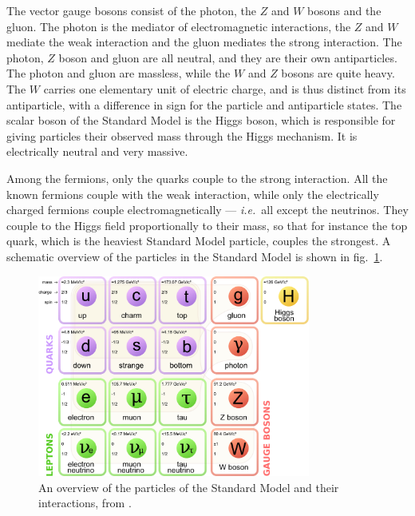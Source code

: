 \documentclass[twoside,english]{uiofysmaster}
\begin{document}
The vector gauge bosons consist of the photon, the $Z$ and $W$ bosons and the gluon. The photon is the mediator of electromagnetic interactions, the $Z$ and $W$ mediate the weak interaction and the gluon mediates the strong interaction. The photon, $Z$ boson and gluon are all neutral, and they are their own antiparticles. The photon and gluon are massless, while the $W$ and $Z$ bosons are quite heavy. The $W$ carries one elementary unit of electric charge, and is thus distinct from its antiparticle, with a difference in sign for the particle and antiparticle states. The scalar boson of the Standard Model is the Higgs boson, which is responsible for giving particles their observed mass through the Higgs mechanism. It is electrically neutral and very massive.

Among the fermions, only the quarks couple to the strong interaction. All the known fermions couple with the weak interaction, while only the electrically charged fermions couple electromagnetically --- {\it i.e.}\ all except the neutrinos. They couple to the Higgs field proportionally to their mass, so that for instance the top quark, which is the heaviest Standard Model particle, couples the strongest. A schematic overview of the particles in the Standard Model is shown in fig.\ \ref{fig:SM_particles}.
\begin{figure}[hbt]
	\centering
	\includegraphics[width=0.8\textwidth]{figures/susyintro/Standard_Model_of_Elementary_Particles.pdf}
	\caption{An overview of the particles of the Standard Model and their interactions, from \cite{Wikimedia_SM_particles}.}
	\label{fig:SM_particles}
\end{figure}
\end{document}
